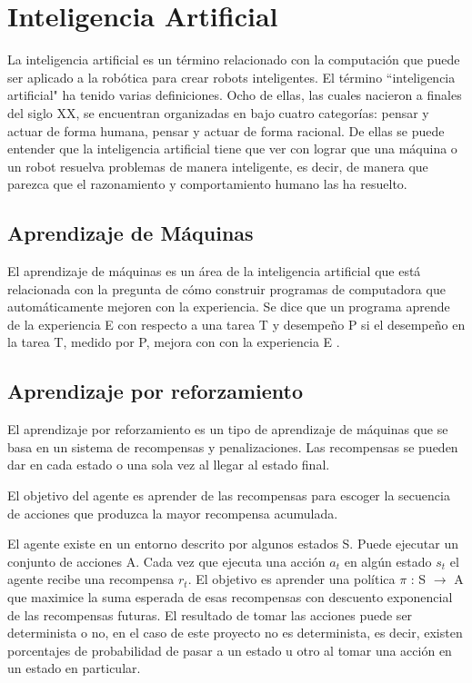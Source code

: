 \section{Inteligencia Artificial} \label{sect:Inteligencia_Artificial}
La inteligencia artificial es un término relacionado con la computación que puede ser aplicado a la robótica para crear robots inteligentes. El término ``inteligencia artificial"  ha tenido varias definiciones. Ocho de ellas, las cuales nacieron a finales del siglo XX, se encuentran organizadas en \cite{peterNorvig} bajo cuatro categorías: pensar y actuar de forma humana, pensar y actuar de forma racional. De ellas se puede entender que la inteligencia artificial tiene que ver con lograr que una máquina o un robot resuelva problemas de manera inteligente, es decir, de manera que parezca que el razonamiento y comportamiento humano las ha resuelto.  

\subsection{ Aprendizaje de Máquinas}
El aprendizaje de máquinas es un área de la inteligencia artificial que está relacionada con la pregunta de cómo construir programas de computadora que automáticamente mejoren con la experiencia. Se dice que un programa aprende de la experiencia E con respecto a una tarea T y desempeño P si el desempeño en la tarea T, medido por P, mejora con con la experiencia E \cite{Mitchell}.

\subsection{Aprendizaje por reforzamiento}
El aprendizaje por reforzamiento es un tipo de aprendizaje de máquinas que se basa en un sistema de recompensas y penalizaciones. Las recompensas se pueden dar en cada estado o una sola vez al llegar al estado final.

El objetivo del agente es aprender de las recompensas para escoger la secuencia de acciones que produzca la mayor recompensa acumulada. \cite{Mitchell}

El agente existe en un entorno descrito por algunos estados S. Puede ejecutar un conjunto de acciones A. Cada vez que ejecuta una acción $a_t$ en algún estado $s_t$ el agente recibe una recompensa $r_t$. El objetivo es aprender una política $\pi$ : S $\to$ A que maximice la suma esperada de esas recompensas con descuento exponencial de las recompensas futuras. \cite{Mitchell} El resultado de tomar las acciones puede ser determinista o no, en el caso de este proyecto no es determinista, es decir, existen porcentajes de probabilidad de pasar a un estado u otro al tomar una acción en un estado en particular.  
